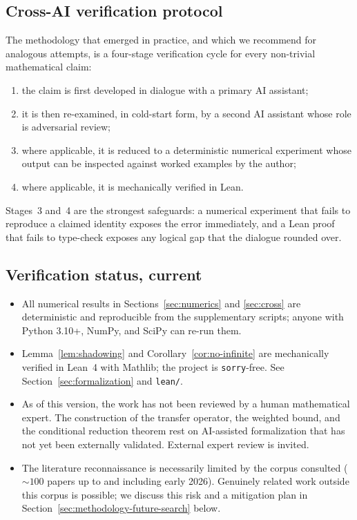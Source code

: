 \documentclass[11pt,a4paper]{article}
\theoremstyle{definition}
\begin{document}
\subsection{Cross-AI verification protocol}

The methodology that emerged in practice, and which we recommend
for analogous attempts, is a four-stage verification cycle for
every non-trivial mathematical claim:
\begin{enumerate}
  \item the claim is first developed in dialogue with a primary
        AI assistant;
  \item it is then re-examined, in cold-start form, by a second
        AI assistant whose role is adversarial review;
  \item where applicable, it is reduced to a deterministic
        numerical experiment whose output can be inspected
        against worked examples by the author;
  \item where applicable, it is mechanically verified in Lean.
\end{enumerate}
Stages~3 and~4 are the strongest safeguards: a numerical
experiment that fails to reproduce a claimed identity exposes the
error immediately, and a Lean proof that fails to type-check
exposes any logical gap that the dialogue rounded over.

\subsection{Verification status, current}

\begin{itemize}
  \item All numerical results in Sections~\ref{sec:numerics} and
        \ref{sec:cross} are deterministic and reproducible from
        the supplementary scripts; anyone with Python 3.10+,
        NumPy, and SciPy can re-run them.
  \item Lemma~\ref{lem:shadowing} and
        Corollary~\ref{cor:no-infinite} are mechanically verified
        in Lean~4 with Mathlib; the project is \texttt{sorry}-free.
        See Section~\ref{sec:formalization} and \texttt{lean/}.
  \item As of this version, the work has not been reviewed by a
        human mathematical expert. The construction of the
        transfer operator, the weighted bound, and the conditional
        reduction theorem rest on AI-assisted formalization that
        has not yet been externally validated. External expert
        review is invited.
  \item The literature reconnaissance is necessarily limited by
        the corpus consulted ($\sim 100$ papers up to and
        including early 2026). Genuinely related work outside
        this corpus is possible; we discuss this risk and a
        mitigation plan in
        Section~\ref{sec:methodology-future-search} below.
\end{itemize}
\end{document}
